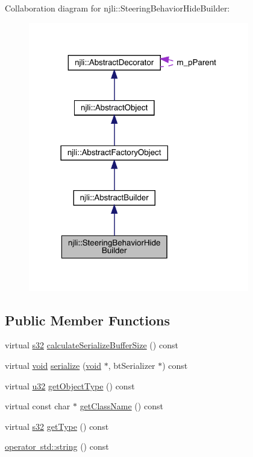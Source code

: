 Collaboration diagram for njli\+:\+:Steering\+Behavior\+Hide\+Builder\+:\nopagebreak
\begin{figure}[H]
\begin{center}
\leavevmode
\includegraphics[width=273pt]{classnjli_1_1_steering_behavior_hide_builder__coll__graph}
\end{center}
\end{figure}
\subsection*{Public Member Functions}
\begin{DoxyCompactItemize}
\item 
virtual \mbox{\hyperlink{_util_8h_aa62c75d314a0d1f37f79c4b73b2292e2}{s32}} \mbox{\hyperlink{classnjli_1_1_steering_behavior_hide_builder_ad5bf79f75acd7065d40437f5dac90fe4}{calculate\+Serialize\+Buffer\+Size}} () const
\item 
virtual \mbox{\hyperlink{_thread_8h_af1e856da2e658414cb2456cb6f7ebc66}{void}} \mbox{\hyperlink{classnjli_1_1_steering_behavior_hide_builder_aa58fb1f83e305f23906e6cadb9e7b31d}{serialize}} (\mbox{\hyperlink{_thread_8h_af1e856da2e658414cb2456cb6f7ebc66}{void}} $\ast$, bt\+Serializer $\ast$) const
\item 
virtual \mbox{\hyperlink{_util_8h_a10e94b422ef0c20dcdec20d31a1f5049}{u32}} \mbox{\hyperlink{classnjli_1_1_steering_behavior_hide_builder_ab3b080cf4885df0292810ea80086bd87}{get\+Object\+Type}} () const
\item 
virtual const char $\ast$ \mbox{\hyperlink{classnjli_1_1_steering_behavior_hide_builder_a63ec8fd65ed7f2242f66a309459a7f99}{get\+Class\+Name}} () const
\item 
virtual \mbox{\hyperlink{_util_8h_aa62c75d314a0d1f37f79c4b73b2292e2}{s32}} \mbox{\hyperlink{classnjli_1_1_steering_behavior_hide_builder_a12a25b19b54be304480aa0706dd87894}{get\+Type}} () const
\item 
\mbox{\hyperlink{classnjli_1_1_steering_behavior_hide_builder_a1c2531e33e1870ff88d70f2def92c2ed}{operator std\+::string}} () const
\end{DoxyCompactItemize}
